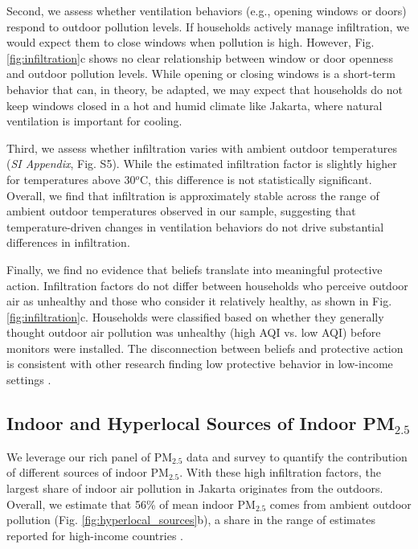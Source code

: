 \documentclass[9pt,twocolumn,twoside]{pnas-new}
\begin{document}
Second, we assess whether ventilation behaviors (e.g., opening windows or doors) respond to outdoor pollution levels. If households actively manage infiltration, we would expect them to close windows when pollution is high. However, Fig. \ref{fig:infiltration}c shows no clear relationship between window or door openness and outdoor pollution levels. While opening or closing windows is a short-term behavior that can, in theory, be adapted, we may expect that households do not keep windows closed in a hot and humid climate like Jakarta, where natural ventilation is important for cooling. 

Third, we assess whether infiltration varies with ambient outdoor temperatures (\textit{SI Appendix}, Fig. S5). While the estimated infiltration factor is slightly higher for temperatures above 30$^o$C, this difference is not statistically significant. Overall, we find that infiltration is approximately stable across the range of ambient outdoor temperatures observed in our sample, suggesting that temperature-driven changes in ventilation behaviors do not drive substantial differences in infiltration.

Finally, we find no evidence that beliefs translate into meaningful protective action. Infiltration factors do not differ between households who perceive outdoor air as unhealthy and those who consider it relatively healthy, as shown in Fig. \ref{fig:infiltration}c. Households were classified based on whether they generally thought outdoor air pollution was unhealthy (high AQI vs. low AQI) before monitors were installed. The disconnection between beliefs and protective action is consistent with other research finding low protective behavior in low-income settings \citep{greenstone_indoor_2021, chowdhury_misbeliefs_2025}.



\subsection{Indoor and Hyperlocal Sources of Indoor PM$_{2.5}$}

We leverage our rich panel of PM$_{2.5}$ data and survey to quantify the contribution of different sources of indoor PM$_{2.5}$. With these high infiltration factors, the largest share of indoor air pollution in Jakarta originates from the outdoors. Overall, we estimate that 56\% of mean indoor PM$_{2.5}$ comes from ambient outdoor pollution (Fig. \ref{fig:hyperlocal_sources}b), a share in the range of estimates reported for high-income countries \citep{lunderberg_assessing_2023}.
\end{document}
